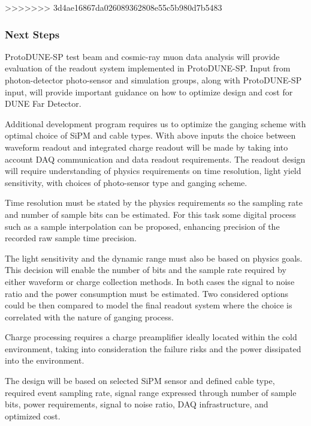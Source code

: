 >>>>>>> 3d4ae16867da026089362808e55c5b980d7b5483


\subsubsection{Next Steps}

ProtoDUNE-SP test beam and cosmic-ray muon data analysis will provide evaluation of the readout system implemented in ProtoDUNE-SP.
Input from photon-detector photo-sensor and simulation groups, along with ProtoDUNE-SP input,  will provide important guidance on
how to optimize design and cost for DUNE Far Detector.

Additional development program requires us to optimize the ganging scheme with optimal choice of SiPM and cable types. With above inputs 
the choice between waveform readout and integrated charge readout will be made by taking into account DAQ communication and data 
readout requirements. The readout design will require understanding of physics requirements on time resolution, light yield 
sensitivity, with choices of photo-sensor type and ganging scheme. 

Time resolution must be stated by the physics requirements so the sampling rate and number of sample bits can be estimated. For this task 
some digital process such as a sample interpolation can be proposed, enhancing precision of the recorded raw sample time precision.

The light sensitivity and the dynamic range must also be based on physics goals. This decision will enable the number of bits and the sample 
rate required by either waveform or charge collection methods. In both cases the signal to noise ratio and the power consumption must be estimated. 
Two considered options could be then compared to model the final readout system where the choice is  correlated with the nature of ganging process. 


Charge processing requires a charge preamplifier ideally located within the cold environment, taking into consideration the failure risks and the power 
dissipated into the environment.

The design will be based on selected SiPM sensor and defined cable type, required event sampling rate, signal range expressed 
through number of sample bits, power requirements, signal to noise ratio, DAQ infrastructure, and optimized cost.


